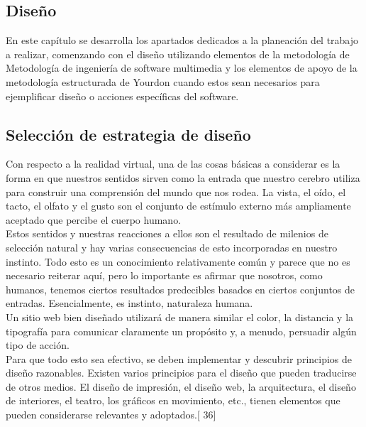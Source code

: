 \begin{center}
\chapter{Diseño}
\end{center}
\newpage

En este capítulo se desarrolla los apartados dedicados a la planeación del trabajo a realizar, comenzando con el diseño utilizando elementos de la metodología de Metodología de ingeniería de software multimedia y los elementos de apoyo de la metodología estructurada de Yourdon cuando estos sean necesarios para ejemplificar diseño o acciones específicas del software. 

\section{Selección de estrategia de diseño}
Con respecto a la realidad virtual, una de las cosas básicas a considerar es la forma en que nuestros sentidos sirven como la entrada que nuestro cerebro utiliza para construir una comprensión del mundo que nos rodea. La vista, el oído, el tacto, el olfato y el gusto son el conjunto de estímulo externo más ampliamente aceptado que percibe el cuerpo humano.\\

Estos sentidos y nuestras reacciones a ellos son el resultado de milenios de selección natural y hay varias consecuencias de esto incorporadas en nuestro instinto. Todo esto es un conocimiento relativamente común y parece que no es necesario reiterar aquí, pero lo importante es afirmar que nosotros, como humanos, tenemos ciertos resultados predecibles basados en ciertos conjuntos de entradas. Esencialmente, es instinto, naturaleza humana.\\

Un sitio web bien diseñado utilizará de manera similar el color, la distancia y la tipografía para comunicar claramente un propósito y, a menudo, persuadir algún tipo de acción.\\

Para que todo esto sea efectivo, se deben implementar y descubrir principios de diseño razonables. Existen varios principios para el diseño que pueden traducirse de otros medios. El diseño de impresión, el diseño web, la arquitectura, el diseño de interiores, el teatro, los gráficos en movimiento, etc., tienen elementos que pueden considerarse relevantes y adoptados.[ 36]\\

